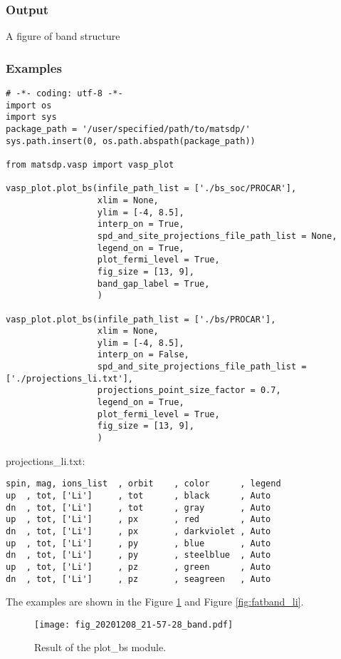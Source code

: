 \documentclass[12pt]{book}
\begin{document}
\subsubsection{Output}
A figure of band structure
\subsubsection{Examples}

\begin{lstlisting}[basicstyle=\small]
# -*- coding: utf-8 -*-
import os
import sys
package_path = '/user/specified/path/to/matsdp/'
sys.path.insert(0, os.path.abspath(package_path))

from matsdp.vasp import vasp_plot

vasp_plot.plot_bs(infile_path_list = ['./bs_soc/PROCAR'],
                  xlim = None,
                  ylim = [-4, 8.5],
                  interp_on = True,
                  spd_and_site_projections_file_path_list = None,
                  legend_on = True,
                  plot_fermi_level = True,
                  fig_size = [13, 9],
                  band_gap_label = True,
                  )

vasp_plot.plot_bs(infile_path_list = ['./bs/PROCAR'],
                  xlim = None,
                  ylim = [-4, 8.5],
                  interp_on = False,
                  spd_and_site_projections_file_path_list = ['./projections_li.txt'],
                  projections_point_size_factor = 0.7,
                  legend_on = True,
                  plot_fermi_level = True,
                  fig_size = [13, 9],
                  )
\end{lstlisting}
projections\_li.txt:
\begin{lstlisting}
spin, mag, ions_list  , orbit    , color      , legend
up  , tot, ['Li']     , tot      , black      , Auto
dn  , tot, ['Li']     , tot      , gray       , Auto
up  , tot, ['Li']     , px       , red        , Auto
dn  , tot, ['Li']     , px       , darkviolet , Auto
up  , tot, ['Li']     , py       , blue       , Auto
dn  , tot, ['Li']     , py       , steelblue  , Auto
up  , tot, ['Li']     , pz       , green      , Auto
dn  , tot, ['Li']     , pz       , seagreen   , Auto
\end{lstlisting}

The examples are shown in the Figure \ref{fig:bs_li} and Figure \ref{fig:fatband_li}.

\begin{figure}[htbp]
\centering
\texttt{[image: fig\_20201208\_21-57-28\_band.pdf]}
\caption{Result of the plot\_bs module.}
\label{fig:bs_li}
\end{figure}
\end{document}
